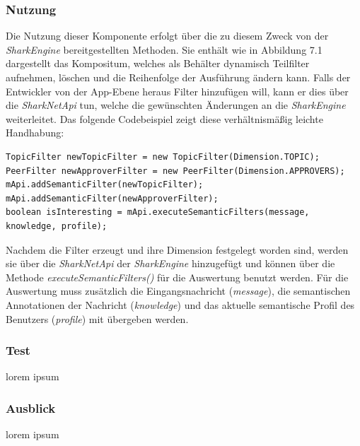 \subsubsection{Nutzung}
Die Nutzung dieser Komponente erfolgt über die zu diesem Zweck von der \textit{SharkEngine} bereitgestellten Methoden. Sie enthält wie in Abbildung 7.1 dargestellt das Kompositum, welches als Behälter dynamisch Teilfilter aufnehmen, löschen und die Reihenfolge der Ausführung ändern kann. Falls der Entwickler von der App-Ebene heraus Filter hinzufügen will, kann er dies über die \textit{SharkNetApi} tun, welche die gewünschten Änderungen an die \textit{SharkEngine} weiterleitet. Das folgende Codebeispiel zeigt diese ver\-hält\-nis\-mä\-ßig leichte Handhabung:
 \lstset{language=Java, caption=Beispiel für die Anwendung der Filter, label=DescriptiveLabel, numbers=left, numbersep=1em, breaklines=true, basicstyle=\small}
 \begin{lstlisting}
TopicFilter newTopicFilter = new TopicFilter(Dimension.TOPIC);
PeerFilter newApproverFilter = new PeerFilter(Dimension.APPROVERS);
mApi.addSemanticFilter(newTopicFilter);
mApi.addSemanticFilter(newApproverFilter);
boolean isInteresting = mApi.executeSemanticFilters(message, knowledge, profile);
 \end{lstlisting}
Nachdem die Filter erzeugt und ihre Dimension festgelegt worden sind, werden sie über die \textit{SharkNetApi} der \textit{SharkEngine} hinzugefügt und können über die Methode \textit{executeSemanticFilters()} für die Auswertung benutzt werden. Für die Auswertung muss zusätzlich die Eingangsnachricht (\textit{message}), die semantischen Annotationen der Nachricht (\textit{knowledge}) und das aktuelle semantische Profil des Benutzers (\textit{profile}) mit übergeben werden.



\subsubsection{Test}
lorem ipsum


\subsubsection{Ausblick}
lorem ipsum
\newpage